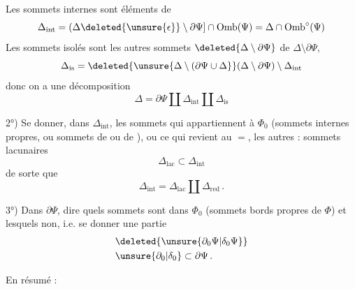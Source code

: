

Les sommets  internes sont  éléments de
\[
\Delta_{\mathrm{int}}=(\Delta\deleted{\unsure{\epsilon}}\setminus\partial\Psi]\cap\mathrm{Omb}(\Psi)=\Delta\cap\mathrm{Omb}^{\circ}(\Psi)
\]
Les sommets isolés sont  les autres sommets $\deleted{\Delta\setminus\partial\Psi}$ de $\Delta\setminus\partial\Psi$,
\[
\Delta_{\mathrm{is}}=\deleted{\unsure{\Delta\setminus(\partial\Psi\cup\Delta}}(\Delta\setminus\partial\Psi)\setminus\Delta_{\mathrm{int}}
\]
donc on a une décomposition
\[
\Delta=\partial\Psi\amalg\Delta_{\mathrm{int}}\amalg\Delta_{\mathrm{is}}
\]

2°) Se donner, dans $\Delta_{\mathrm{int}}$, les sommets qui appartiennent à $\Phi_0$ (sommets internes propres, ou sommets de  ou de ), ou ce qui revient au $=$, les autres :  sommets lacunaires
\[
\boxed{\Delta_{\mathrm{lac}}}\subset\Delta_{\mathrm{int}}
\]
de sorte que
\[
\Delta_{\mathrm{int}}=\Delta_{\mathrm{lac}}\amalg\Delta_{\mathrm{red}}\,.
\]

3°) Dans $\partial\Psi$\inserted{$(=\partial\Phi)$}, dire quels sommets sont dans $\Phi_0$  (sommets bords propres de $\Phi$) et lesquels non, i.e. se donner une partie
\[
\begin{aligned}
&\deleted{\unsure{\partial_0\Psi|\delta_0\Psi}}\\
&\unsure{\partial_0|\delta_0}\subset\partial\Psi\,.
\end{aligned}
\]

En résumé :
